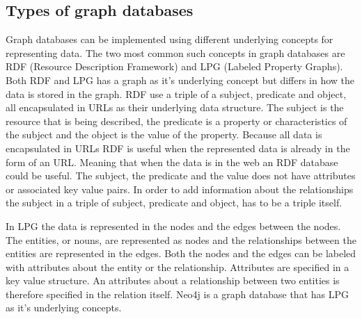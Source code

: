 \subsection{Types of graph databases}

Graph databases can be implemented using different underlying concepts for representing data. The two most common such concepts in graph databases are RDF (Resource Description Framework) and LPG (Labeled Property Graphs). Both RDF and LPG has a graph as it's underlying concept but differs in how the data is stored in the graph. RDF use a triple of a subject, predicate and object, all encapsulated in URLs as their underlying data structure. The subject is the resource that is being described, the predicate is a property or characteristics of the subject and the object is the value of the property. Because all data is encapsulated in URLs RDF is useful when the represented data is already in the form of an URL. Meaning that when the data is in the web an RDF database could be useful. The subject, the predicate and the value does not have attributes or associated key value pairs. In order to add information about the relationships the subject in a triple of subject, predicate and object, has to be a triple itself. 

In LPG the data is represented in the nodes and the edges between the nodes. The entities, or nouns, are represented as nodes and the relationships between the entities are represented in the edges. Both the nodes and the edges can be labeled with attributes about the entity or the relationship. Attributes are specified in a key value structure. An attributes about a relationship between two entities is therefore specified in the relation itself. Neo4j is a graph database that has LPG as it's underlying concepts.
